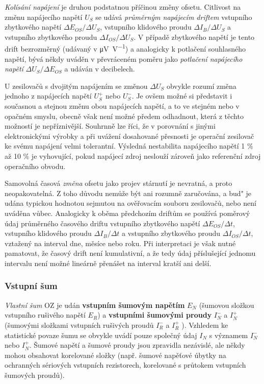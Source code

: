        \emph{Kolísání napájení} je druhou podstatnou příčinou změny ofsetu. Citlivost na změnu
        napájecího napětí \(U_S\) se udává \emph{průměrným napájecím driftem} vstupního zbytkového
        napětí \(\Delta E_{OS}/\Delta U_S\), vstupního klidového proudu \(\Delta I_B/\Delta U_S\) a
        vstupního zbytkového proudu \(\Delta I_{OS}/\Delta U_S\). V případě zbytkového napětí je
        tento drift bezrozměrný (udávaný v \unit{\micro\volt\per\volt}) a analogicky k potlačení
        souhlasného napětí, bývá někdy uváděn v převráceném poměru jako \emph{potlačení napájecího
        napětí} \(\Delta U_S/\Delta E_{OS}\) a udáván v decibelech.

        U zesilovačů s dvojitým napájením se změnou \(\Delta U_S\) obvykle rozumí změna jednoho z
        napájecích napětí \(U_S^+\) nebo \(U_S^-\). Je ovšem možné si představit i současnou a
        stejnou změnu obou napájecích napětí, a to ve stejném nebo v opačném smyslu, obecně však
        není možné předem odhadnout, která z těchto možností je nepříznivější. Souhrnně lze říci, že
        v porovnání s jinými elektronickými výrobky a při uvážení dosahované přesnosti je operační
        zesilovač ke svému napájení velmi tolerantní. Výsledná nestabilita napájecího napětí 1 \% až
        10 \% je vyhovující, pokud napájecí zdroj neslouží zároveň jako referenční zdroj operačního
        obvodu.

        Samovolná časová \emph{změna} ofsetu jako projev stárnutí je nevratná, a proto
        neopakovatelná. Z toho důvodu nemůže být ani rozumně zaručována, a bud" je udána typickou
        hodnotou sejmutou na ověřovacím souboru zesilovačů, nebo není uváděna vůbec. Analogicky k
        oběma předchozím driftům se používá poměrový údaj průměrného časového driftu vstupního
        zbytkového napětí \(\Delta E_{OS}/\Delta t\), vstupního klidového proudu \(\Delta I_B/\Delta
        t\) a vstupního zbytkového proudu \(\Delta I_{OS}/\Delta t\), vztažený na interval dne,
        měsíce nebo roku. Při interpretaci je však nutné pamatovat, že časový drift není
        kumulativní, a že tedy údaj příslušející jednomu intervalu není možné lineárně přenášet na
        interval kratší ani delší.

      \subsubsection{Vstupní šum}\label{aesIchIIIsecIIssecIV}
        \emph{Vlastní šum} OZ je udán \textbf{vstupním šumovým napětím} \(E_N\) (šumovou složkou
        vstupního rušivého napětí \(E_R\)) a \textbf{vstupními šumovými proudy} \(I_N^-\) a \(I_N^+\)
        (šumovými složkami vstupních rušivých proudů \(I_R^-\) a \(I_R^+\) ). Vzhledem ke statistické
        povaze šumu se obvykle uvádí pouze společný údaj \(I_N\) s významem \(I_N^-\) nebo \(I_N^+\).
        Šumové napětí a šumové proudy jsou zpravidla nezávislé, ale někdy mohou obsahovat korelované
        složky (např. šumové napěťové úbytky na ochranných sériových vstupních rezistorech, korelované
        s průtokem vstupních šumových proudů).
        
